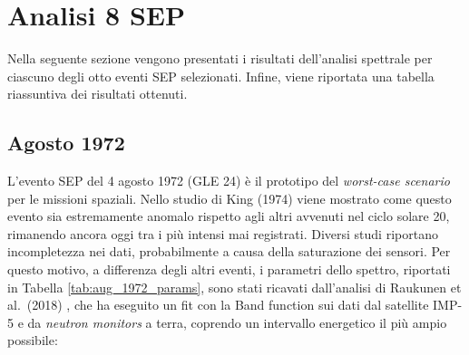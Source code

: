 \documentclass[12pt]{report}
\begin{document}
\section{Analisi 8 SEP}\label{sec:analisi_8_SEP_fit}
Nella seguente sezione vengono presentati i risultati dell'analisi spettrale per ciascuno degli otto eventi SEP selezionati. Infine, viene riportata una tabella riassuntiva dei risultati ottenuti.

\subsection{Agosto 1972}
L'evento SEP del 4 agosto 1972 (GLE 24) è il prototipo del \textit{worst-case scenario} per le missioni spaziali. Nello studio di King (1974) \cite{King1974} viene mostrato come questo evento sia estremamente anomalo rispetto agli altri avvenuti nel ciclo solare 20, rimanendo ancora oggi tra i più intensi mai registrati. Diversi studi \cite{Jiggens2014} riportano incompletezza nei dati, probabilmente a causa della saturazione dei sensori. Per questo motivo, a differenza degli altri eventi, i parametri dello spettro, riportati in Tabella \ref{tab:aug_1972_params}, sono stati ricavati dall'analisi di Raukunen et al.\ (2018) \cite{Raukunen2018}, che ha eseguito un fit con la Band function sui dati dal satellite IMP-5 e da \textit{neutron monitors} a terra, coprendo un intervallo energetico il più ampio possibile:
\end{document}
